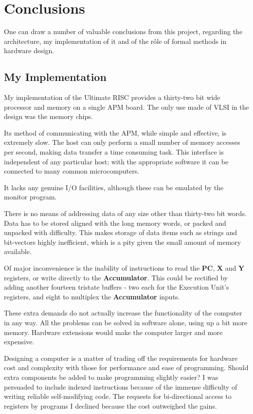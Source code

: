 \chapter{Conclusions}

One can draw a number of valuable conclusions from this project, regarding
the architecture, my implementation of it and of the r\^{o}le of formal methods in  hardware design.

\section{My Implementation}
My implementation of the Ultimate RISC provides a thirty-two bit wide processor and  memory on a single APM board. 
The only use made  of VLSI in the design was the memory chips. 

Its method of communicating with the APM, while simple and effective, is extremely slow.
The host can only perform a small number of memory accesses per second, making data transfer a time consuming task. 
This interface is independent of any particular host; with the appropriate software it can be connected to many common microcomputers.

It lacks any genuine I/O facilities, although these can be emulated by the monitor program. 

There is no means  of addressing data of any size other than thirty-two bit words. 
Data has to be stored aligned with the long memory words, or packed and unpacked with difficulty.
This makes storage of data items such as strings and bit-vectors highly inefficient, which is a pity given the small amount of memory available.

Of major inconvenience   is the inability of instructions to read  the
{\bf PC}, {\bf X} and {\bf Y} registers, or write directly to the {\bf Accumulator}. This could be rectified by adding another fourteen tristate buffers - two each for the Execution Unit's registers, and eight to multiplex the {\bf Accumulator} inputs. 

These extra demands do not actually increase the functionality of the computer in any way. 
All the problems can be solved in software alone, using up a bit more memory.
 Hardware extensions would make the computer larger and more expensive.

Designing a computer is a matter of trading off the requirements for hardware cost and complexity with those for performance and ease of programming.
Should extra components be added to make programming slightly easier?
I was persuaded to include indexed instructions because of the immense difficulty of writing reliable self-modifying code. 
The requests for bi-directional access to registers by programs I declined because the cost outweighed the gains.

